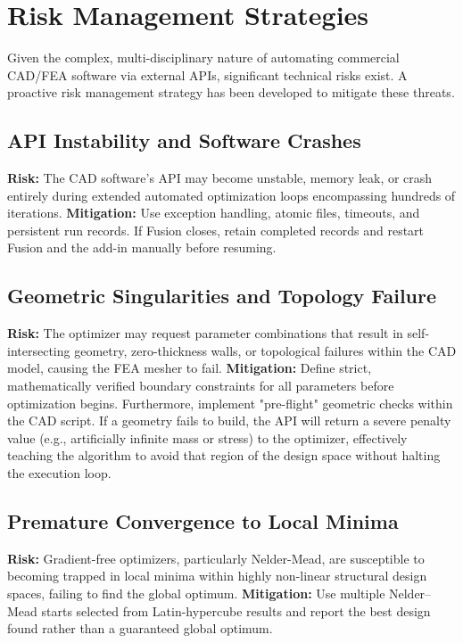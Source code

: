\section{Risk Management Strategies}
Given the complex, multi-disciplinary nature of automating commercial CAD/FEA software via external APIs, significant technical risks exist. A proactive risk management strategy has been developed to mitigate these threats.

\subsection{API Instability and Software Crashes}
\textbf{Risk:} The CAD software's API may become unstable, memory leak, or crash entirely during extended automated optimization loops encompassing hundreds of iterations.
\textbf{Mitigation:} Use exception handling, atomic files, timeouts, and persistent run records. If Fusion closes, retain completed records and restart Fusion and the add-in manually before resuming.

\subsection{Geometric Singularities and Topology Failure}
\textbf{Risk:} The optimizer may request parameter combinations that result in self-intersecting geometry, zero-thickness walls, or topological failures within the CAD model, causing the FEA mesher to fail.
\textbf{Mitigation:} Define strict, mathematically verified boundary constraints for all parameters before optimization begins. Furthermore, implement "pre-flight" geometric checks within the CAD script. If a geometry fails to build, the API will return a severe penalty value (e.g., artificially infinite mass or stress) to the optimizer, effectively teaching the algorithm to avoid that region of the design space without halting the execution loop.

\subsection{Premature Convergence to Local Minima}
\textbf{Risk:} Gradient-free optimizers, particularly Nelder-Mead, are susceptible to becoming trapped in local minima within highly non-linear structural design spaces, failing to find the global optimum.
\textbf{Mitigation:} Use multiple Nelder--Mead starts selected from Latin-hypercube results and report the best design found rather than a guaranteed global optimum.

